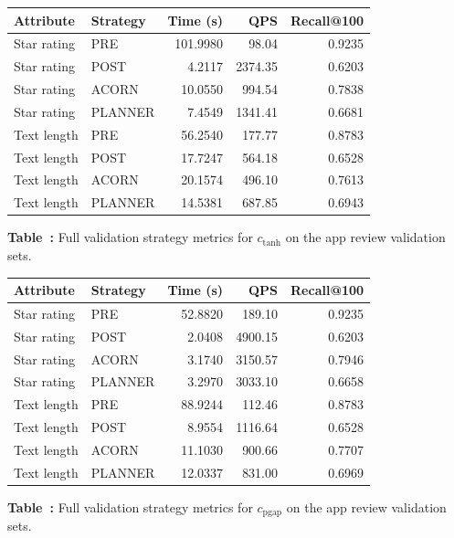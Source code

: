 \begin{center}
\renewcommand{\arraystretch}{1.12}
\begin{tabular}{llrrr}
    \toprule
    Attribute & Strategy & Time (s) & QPS & Recall@100 \\
    \midrule
    Star rating & PRE     & 101.9980 & 98.04   & 0.9235 \\
    Star rating & POST    & 4.2117   & 2374.35 & 0.6203 \\
    Star rating & ACORN   & 10.0550  & 994.54  & 0.7838 \\
    Star rating & PLANNER & 7.4549   & 1341.41 & 0.6681 \\
    \midrule
    Text length & PRE     & 56.2540  & 177.77  & 0.8783 \\
    Text length & POST    & 17.7247  & 564.18  & 0.6528 \\
    Text length & ACORN   & 20.1574  & 496.10  & 0.7613 \\
    Text length & PLANNER & 14.5381  & 687.85  & 0.6943 \\
    \bottomrule
\end{tabular}

\vspace{0.4em}
\label{tab:appendix-validation-app-reviews-tanh-full}
\parbox{0.92\textwidth}{\centering\small
\textbf{Table~\thetable:} Full validation strategy metrics for \(c_{\mathrm{tanh}}\) on the app review validation sets.}
\end{center}


\begin{center}
\renewcommand{\arraystretch}{1.12}
\begin{tabular}{llrrr}
    \toprule
    Attribute & Strategy & Time (s) & QPS & Recall@100 \\
    \midrule
    Star rating & PRE     & 52.8820 & 189.10  & 0.9235 \\
    Star rating & POST    & 2.0408  & 4900.15 & 0.6203 \\
    Star rating & ACORN   & 3.1740  & 3150.57 & 0.7946 \\
    Star rating & PLANNER & 3.2970  & 3033.10 & 0.6658 \\
    \midrule
    Text length & PRE     & 88.9244 & 112.46  & 0.8783 \\
    Text length & POST    & 8.9554  & 1116.64 & 0.6528 \\
    Text length & ACORN   & 11.1030 & 900.66  & 0.7707 \\
    Text length & PLANNER & 12.0337 & 831.00  & 0.6969 \\
    \bottomrule
\end{tabular}

\vspace{0.4em}
\label{tab:appendix-validation-app-reviews-pgap-full}
\parbox{0.92\textwidth}{\centering\small
\textbf{Table~\thetable:} Full validation strategy metrics for \(c_{\mathrm{pgap}}\) on the app review validation sets.}
\end{center}
